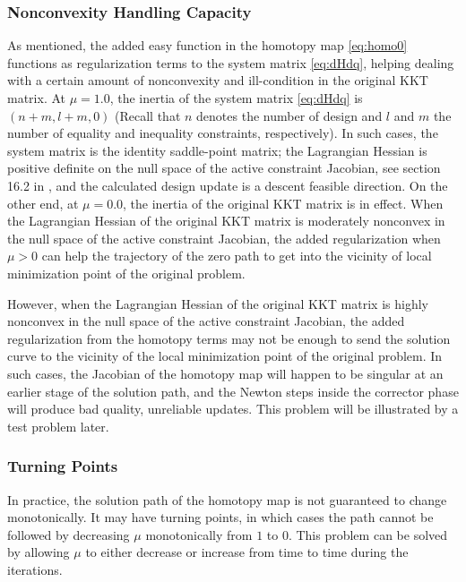 \documentclass{article}
\theoremstyle{definition}
\begin{document}
\subsubsection{Nonconvexity Handling Capacity}
As mentioned, the added easy function in the homotopy map \eqref{eq:homo0} functions as regularization terms to the system matrix \eqref{eq:dHdq}, helping dealing with a certain amount of nonconvexity and ill-condition in the original KKT matrix. At $\mu = 1.0$, the inertia of the system matrix \eqref{eq:dHdq} is $(n+m, l+m, 0)$ (Recall that $n$ denotes the number of design and $l$ and $m$ the number of equality and inequality constraints, respectively). In such cases, the system matrix is the identity saddle-point matrix; the Lagrangian Hessian is positive definite on the null space of the active constraint Jacobian, see section 16.2 in \cite{Nocedal2006NO}, and the calculated design update is a descent feasible direction. On the other end, at $\mu = 0.0$, the inertia of the original KKT matrix is in effect. When the Lagrangian Hessian of the original KKT matrix is moderately nonconvex in the null space of the active constraint Jacobian, the added regularization when $\mu > 0$ can help the trajectory of the zero path to get into the vicinity of local minimization point of the original problem. 

However, when the Lagrangian Hessian of the original KKT matrix is highly nonconvex in the null space of the active constraint Jacobian, the added regularization from the homotopy terms may not be enough to send the solution curve to the vicinity of the local minimization point of the original problem. In such cases, the Jacobian of the homotopy map will happen to be singular at an earlier stage of the solution path, and the Newton steps inside the corrector phase will produce bad quality, unreliable updates. This problem will be illustrated by a test problem later. 

\subsubsection{Turning Points}
In practice, the solution path of the homotopy map is not guaranteed to change monotonically. It may have turning points, in which cases the path cannot be followed by decreasing $\mu$ monotonically from $1$ to $0$. This problem can be solved by allowing $\mu$ to either decrease or increase from time to time during the iterations. 
\end{document}
